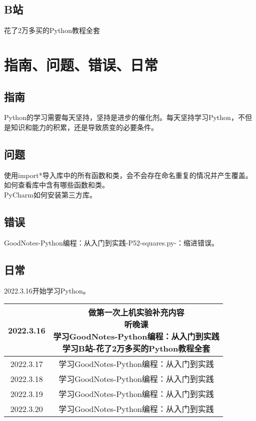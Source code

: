 \documentclass{book}%
\begin{document}
	\section{B站}
	花了2万多买的Python教程全套\\	
	
	\chapter{指南、问题、错误、日常}
	
	\section{指南}
	Python的学习需要每天坚持，坚持是进步的催化剂。每天坚持学习Python，不但是知识和能力的积累，还是导致质变的必要条件。\\
	
	\section{问题}
	使用import*导入库中的所有函数和类，会不会存在命名重复的情况并产生覆盖。\\
	如何查看库中含有哪些函数和类。\\
	PyCharm如何安装第三方库。\\
	
	\section{错误}
	GoodNotes-Python编程：从入门到实践-P52-squares.py-：缩进错误。\\

	\section{日常}
	2022.3.16开始学习Python。\\
	\begin{table}[h]
		\begin{tabular}{|c|c|}
			\hline
			2022.3.16&\makecell[c]{做第一次上机实验补充内容\\听晚课\\学习GoodNotes-Python编程：从入门到实践\\学习B站-花了2万多买的Python教程全套}\\
			\hline
			2022.3.17&\makecell[c]{学习GoodNotes-Python编程：从入门到实践\\}\\
			\hline
			2022.3.18&\makecell[c]{学习GoodNotes-Python编程：从入门到实践\\}\\
			\hline
			2022.3.19&\makecell[c]{学习GoodNotes-Python编程：从入门到实践\\}\\
			\hline
			2022.3.20&\makecell[c]{学习GoodNotes-Python编程：从入门到实践\\}\\
			\hline
		\end{tabular}
	\end{table}
\end{document}

